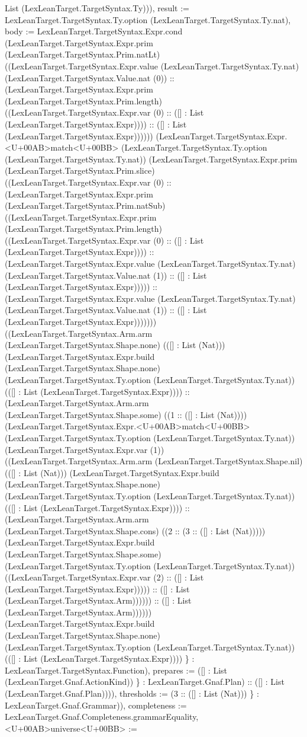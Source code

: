 \documentclass[11pt]{article}
\begin{document}
List (LexLeanTarget.TargetSyntax.Ty))), result := LexLeanTarget.TargetSyntax.Ty.option (LexLeanTarget.TargetSyntax.Ty.nat), body := LexLeanTarget.TargetSyntax.Expr.cond (LexLeanTarget.TargetSyntax.Expr.prim (LexLeanTarget.TargetSyntax.Prim.natLt) ((LexLeanTarget.TargetSyntax.Expr.value (LexLeanTarget.TargetSyntax.Ty.nat) (LexLeanTarget.TargetSyntax.Value.nat (0)) :: (LexLeanTarget.TargetSyntax.Expr.prim (LexLeanTarget.TargetSyntax.Prim.length) ((LexLeanTarget.TargetSyntax.Expr.var (0) :: ([] : List (LexLeanTarget.TargetSyntax.Expr)))) :: ([] : List (LexLeanTarget.TargetSyntax.Expr)))))) (LexLeanTarget.TargetSyntax.Expr.<U+00AB>match<U+00BB> (LexLeanTarget.TargetSyntax.Ty.option (LexLeanTarget.TargetSyntax.Ty.nat)) (LexLeanTarget.TargetSyntax.Expr.prim (LexLeanTarget.TargetSyntax.Prim.slice) ((LexLeanTarget.TargetSyntax.Expr.var (0) :: (LexLeanTarget.TargetSyntax.Expr.prim (LexLeanTarget.TargetSyntax.Prim.natSub) ((LexLeanTarget.TargetSyntax.Expr.prim (LexLeanTarget.TargetSyntax.Prim.length) ((LexLeanTarget.TargetSyntax.Expr.var (0) :: ([] : List (LexLeanTarget.TargetSyntax.Expr)))) :: (LexLeanTarget.TargetSyntax.Expr.value (LexLeanTarget.TargetSyntax.Ty.nat) (LexLeanTarget.TargetSyntax.Value.nat (1)) :: ([] : List (LexLeanTarget.TargetSyntax.Expr))))) :: (LexLeanTarget.TargetSyntax.Expr.value (LexLeanTarget.TargetSyntax.Ty.nat) (LexLeanTarget.TargetSyntax.Value.nat (1)) :: ([] : List (LexLeanTarget.TargetSyntax.Expr))))))) ((LexLeanTarget.TargetSyntax.Arm.arm (LexLeanTarget.TargetSyntax.Shape.none) (([] : List (Nat))) (LexLeanTarget.TargetSyntax.Expr.build (LexLeanTarget.TargetSyntax.Shape.none) (LexLeanTarget.TargetSyntax.Ty.option (LexLeanTarget.TargetSyntax.Ty.nat)) (([] : List (LexLeanTarget.TargetSyntax.Expr)))) :: (LexLeanTarget.TargetSyntax.Arm.arm (LexLeanTarget.TargetSyntax.Shape.some) ((1 :: ([] : List (Nat)))) (LexLeanTarget.TargetSyntax.Expr.<U+00AB>match<U+00BB> (LexLeanTarget.TargetSyntax.Ty.option (LexLeanTarget.TargetSyntax.Ty.nat)) (LexLeanTarget.TargetSyntax.Expr.var (1)) ((LexLeanTarget.TargetSyntax.Arm.arm (LexLeanTarget.TargetSyntax.Shape.nil) (([] : List (Nat))) (LexLeanTarget.TargetSyntax.Expr.build (LexLeanTarget.TargetSyntax.Shape.none) (LexLeanTarget.TargetSyntax.Ty.option (LexLeanTarget.TargetSyntax.Ty.nat)) (([] : List (LexLeanTarget.TargetSyntax.Expr)))) :: (LexLeanTarget.TargetSyntax.Arm.arm (LexLeanTarget.TargetSyntax.Shape.cons) ((2 :: (3 :: ([] : List (Nat))))) (LexLeanTarget.TargetSyntax.Expr.build (LexLeanTarget.TargetSyntax.Shape.some) (LexLeanTarget.TargetSyntax.Ty.option (LexLeanTarget.TargetSyntax.Ty.nat)) ((LexLeanTarget.TargetSyntax.Expr.var (2) :: ([] : List (LexLeanTarget.TargetSyntax.Expr))))) :: ([] : List (LexLeanTarget.TargetSyntax.Arm)))))) :: ([] : List (LexLeanTarget.TargetSyntax.Arm)))))) (LexLeanTarget.TargetSyntax.Expr.build (LexLeanTarget.TargetSyntax.Shape.none) (LexLeanTarget.TargetSyntax.Ty.option (LexLeanTarget.TargetSyntax.Ty.nat)) (([] : List (LexLeanTarget.TargetSyntax.Expr)))) \} : LexLeanTarget.TargetSyntax.Function), prepares := ([] : List (LexLeanTarget.Gnaf.ActionKind)) \} : LexLeanTarget.Gnaf.Plan) :: ([] : List (LexLeanTarget.Gnaf.Plan)))), thresholds := (3 :: ([] : List (Nat))) \} : LexLeanTarget.Gnaf.Grammar)), completeness := LexLeanTarget.Gnaf.Completeness.grammarEquality, <U+00AB>universe<U+00BB> := 
\end{document}
